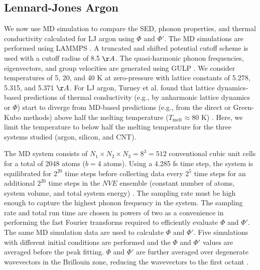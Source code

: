 \subsection{\label{S:Subsection_prop_LJ}Lennard-Jones Argon}
We now use MD simulation to compare the SED, phonon properties, and 
thermal conductivity 
calculated for LJ argon using $\Phi$ and $\Phi'$. The MD simulations are 
performed using 
LAMMPS \cite{LAMMPS}. A truncated and shifted
potential cutoff scheme is used with a cutoff radius of 8.5 $\AA$. The 
quasi-harmonic 
phonon frequencies, eigenvectors, and group velocities are generated 
using GULP \cite{GULP}.
 We consider temperatures of 5, 20, and 40 K at zero-pressure with lattice 
 constants of 
5.278, 5.315, and 5.371 $\AA$. For LJ argon, Turney et al. found that 
lattice dynamics-based 
predictions of thermal conductivity (e.g., by anharmonic lattice dynamics 
or $\Phi$) start to 
diverge from MD-based predictions (e.g., from the direct or Green-Kubo 
methods) above half the 
melting temperature ($T_{\mathrm{melt}} \approx 80$ K) 
\cite{turney_predicting_2009}. Here, we limit the 
temperature to below half the melting temperature for the three systems 
studied (argon, 
silicon, and CNT).

The MD system consists of $N_1 \times N_2 \times N_3 = 8^3 = 512$ 
conventional cubic unit 
cells for a total of 2048 atoms ($b=4$ atoms). Using a 4.285 fs time step, 
the system is 
equilibrated for $2^{20}$ time steps before collecting data every $2^5$ 
time steps for an 
additional $2^{20}$ time steps in the $NVE$ ensemble (constant number of 
atoms, system volume, 
and total system energy) \cite{mcquarrie_statistical_2000}. 
The sampling rate must be high enough to capture 
the highest phonon frequency in the system. The sampling rate and total 
run time are chosen in 
powers of two as a convenience in performing the fast Fourier transforms 
required to efficiently 
evaluate $\Phi$ and $\Phi'$. The same MD simulation data are used to 
calculate $\Phi$ and $\Phi'$.  
Five simulations with different initial conditions are performed and the 
$\Phi$ and $\Phi'$ 
values are averaged before the peak fitting. $\Phi$ and $\Phi'$ are further 
averaged over 
degenerate wavevectors in the Brillouin zone, reducing the wavevectors to 
the first octant 
\cite{mcgaughey_phonon_2004}.

